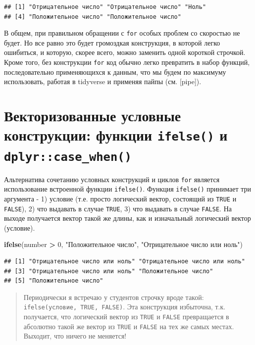 \documentclass[]{book}
\newenvironment{Shaded}{\begin{snugshade}}{\end{snugshade}}
\newcommand{\KeywordTok}[1]{\textcolor[rgb]{0.13,0.29,0.53}{\textbf{#1}}}
\newcommand{\DecValTok}[1]{\textcolor[rgb]{0.00,0.00,0.81}{#1}}
\newcommand{\StringTok}[1]{\textcolor[rgb]{0.31,0.60,0.02}{#1}}
\newcommand{\OperatorTok}[1]{\textcolor[rgb]{0.81,0.36,0.00}{\textbf{#1}}}
\newcommand{\NormalTok}[1]{#1}
\begin{document}
\begin{verbatim}
## [1] "Отрицательное число" "Отрицательное число" "Ноль"               
## [4] "Положительное число" "Положительное число"
\end{verbatim}

В общем, при правильном обращении с \texttt{for} особых проблем со
скоростью не будет. Но все равно это будет громоздкая конструкция, в
которой легко ошибиться, и которую, скорее всего, можно заменить одной
короткой строчкой. Кроме того, без конструкции \texttt{for} код обычно
легко превратить в набор функций, последовательно применяющихся к
данным, что мы будем по максимуму использовать, работая в tidyverse и
применяя пайпы (см. {[}pipe{]}).

\section{\texorpdfstring{Векторизованные условные конструкции: функции
\texttt{ifelse()} и
\texttt{dplyr::case\_when()}}{Векторизованные условные конструкции: функции ifelse() и dplyr::case\_when()}}\label{ifelse}

Альтернатива сочетанию условных конструкций и циклов \texttt{for}
является использование встроенной функции \texttt{ifelse()}. Функция
\texttt{ifelse()} принимает три аргумента - 1) условие (т.е. просто
логический вектор, состоящий из \texttt{TRUE} и \texttt{FALSE}), 2) что
выдавать в случае \texttt{TRUE}, 3) что выдавать в случае
\texttt{FALSE}. На выходе получается вектор такой же длины, как и
изначальный логический вектор (условие).

\begin{Shaded}
\begin{Highlighting}[]
\KeywordTok{ifelse}\NormalTok{(number }\OperatorTok{>}\StringTok{ }\DecValTok{0}\NormalTok{, }\StringTok{"Положительное число"}\NormalTok{, }\StringTok{"Отрицательное число или ноль"}\NormalTok{)}
\end{Highlighting}
\end{Shaded}

\begin{verbatim}
## [1] "Отрицательное число или ноль" "Отрицательное число или ноль"
## [3] "Отрицательное число или ноль" "Положительное число"         
## [5] "Положительное число"
\end{verbatim}

\begin{quote}
Периодически я встречаю у студентов строчку вроде такой:
\texttt{ifelse(условие,\ TRUE,\ FALSE)}. Эта конструкция избыточна, т.к.
получается, что логический вектор из \texttt{TRUE} и \texttt{FALSE}
превращается в абсолютно такой же вектор из \texttt{TRUE} и
\texttt{FALSE} на тех же самых местах. Выходит, что ничего не меняется!
\end{quote}
\end{document}

